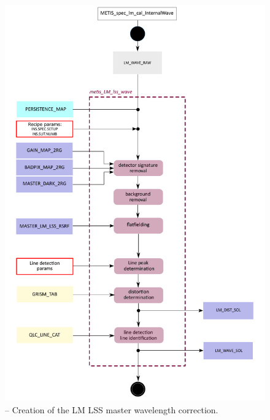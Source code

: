 \begin{figure}[ht]
  \centering
  \includegraphics[width=0.5\textheight]{figures/metis_lm_lss_wave_v0.65.pdf}
  \caption[Recipe: ]{ --
    Creation of the LM LSS master wavelength correction.}
  \label{Fig:rec_lm_lss_wave}
\end{figure}
\clearpage

